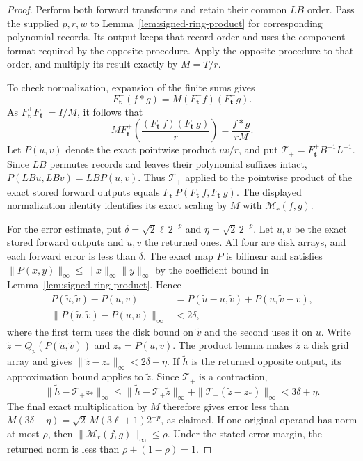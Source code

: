 \begin{proof}
Perform both forward transforms and retain their common $LB$ order.
Pass the supplied $p,r,w$ to
Lemma~\ref{lem:signed-ring-product} for corresponding polynomial records.
Its output keeps that record order and uses the component format
required by the opposite procedure. Apply the opposite procedure
to that order, and multiply its result exactly by $M=T/r$.

To check normalization, expansion of the finite sums gives
\[
 F_{\boldsymbol t}^-(f*g)
       =M(F_{\boldsymbol t}^-f)(F_{\boldsymbol t}^-g).
\]
As $F_{\boldsymbol t}^+F_{\boldsymbol t}^-=I/M$, it follows that
\[
 M F_{\boldsymbol t}^+
       \left(\frac{(F_{\boldsymbol t}^-f)
                          (F_{\boldsymbol t}^-g)}r\right)
       =\frac{f*g}{rM}.
\]
Let $P(u,v)$ denote the exact pointwise product $uv/r$, and put
$\mathcal T_+=F_{\boldsymbol t}^+B^{-1}L^{-1}$.
Since $LB$ permutes records and leaves their polynomial suffixes
intact, $P(LBu,LBv)=LBP(u,v)$.  Thus $\mathcal T_+$ applied to the
pointwise product of the exact stored forward outputs equals
$F_{\boldsymbol t}^+P(F_{\boldsymbol t}^-f,F_{\boldsymbol t}^-g)$.
The displayed normalization identity identifies its exact scaling
by $M$ with $\mathcal M_r(f,g)$.

For the error estimate, put
$\delta=\sqrt2\ell\,2^{-p}$ and $\eta=\sqrt2\,2^{-p}$.
Let $u,v$ be the exact stored forward outputs and
$\widetilde u,\widetilde v$ the returned ones.  All four are disk
arrays, and each forward error is less than $\delta$.
The exact map $P$ is bilinear and satisfies
$\|P(x,y)\|_\infty\leq\|x\|_\infty\|y\|_\infty$ by the coefficient
bound in Lemma~\ref{lem:signed-ring-product}.  Hence
\[
\begin{split}
 P(\widetilde u,\widetilde v)-P(u,v)
   &=P(\widetilde u-u,\widetilde v)+P(u,\widetilde v-v),\\
 \|P(\widetilde u,\widetilde v)-P(u,v)\|_\infty
   &<2\delta,
\end{split}
\]
where the first term uses the disk bound on $\widetilde v$ and the
second uses it on $u$.  Write
$\widetilde z=Q_p(P(\widetilde u,\widetilde v))$ and $z_*=P(u,v)$.
The product lemma makes $\widetilde z$ a disk grid array and gives
$\|\widetilde z-z_*\|_\infty<2\delta+\eta$.
If $\widetilde h$ is the returned opposite output, its approximation
bound applies to $\widetilde z$.  Since $\mathcal T_+$ is a contraction,
\[
 \|\widetilde h-\mathcal T_+ z_*\|_\infty
 \leq\|\widetilde h-\mathcal T_+\widetilde z\|_\infty
       +\|\mathcal T_+(\widetilde z-z_*)\|_\infty
 <3\delta+\eta.
\]
The final exact multiplication by $M$ therefore gives error less than
$M(3\delta+\eta)=\sqrt2\,M(3\ell+1)2^{-p}$, as claimed.
If one original operand has norm at most $\rho$, then
$\|\mathcal M_r(f,g)\|_\infty\leq\rho$.  Under the stated error
margin, the returned norm is less than $\rho+(1-\rho)=1$.


\end{proof}
